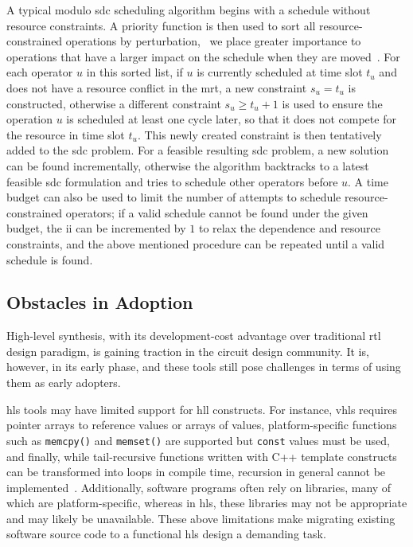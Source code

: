 A typical modulo \gls{sdc} scheduling algorithm begins with a schedule
without resource constraints.  A priority function is then used to sort
all resource-constrained operations by perturbation, \ie~we place greater
importance to operations that have a larger impact on the schedule when they
are moved~\cite{canis14}.  For each operator $u$ in this sorted list, if $u$ is
currently scheduled at time slot $t_u$ and does not have a resource conflict
in the \gls{mrt}, a new constraint $s_u = t_u$ is constructed, otherwise a
different constraint $s_u \geq t_u + 1$ is used to ensure the operation $u$
is scheduled at least one cycle later, so that it does not compete for the
resource in time slot $t_u$.  This newly created constraint is then tentatively
added to the \gls{sdc} problem.  For a feasible resulting \gls{sdc} problem, a
new solution can be found incrementally, otherwise the algorithm backtracks to
a latest feasible \gls{sdc} formulation and tries to schedule other operators
before $u$.  A time budget can also be used to limit the number of attempts to
schedule resource-constrained operators; if a valid schedule cannot be found
under the given budget, the \gls{ii} can be incremented by $1$ to relax the
dependence and resource constraints, and the above mentioned procedure can be
repeated until a valid schedule is found.


\subsection{Obstacles in Adoption}
\label{bg:sub:obstacles_in_adoption}

High-level synthesis, with its development-cost advantage over traditional
\gls{rtl} design paradigm, is gaining traction in the circuit design community.
It is, however, in its early phase, and these tools still pose challenges in
terms of using them as early adopters.

\Gls{hls} tools may have limited support for \gls{hll} constructs.  For
instance, \gls{vhls} requires pointer arrays to reference values or arrays of
values, platform-specific functions such as \verb|memcpy()| and \verb|memset()|
are supported but \verb|const| values must be used, and finally, while
tail-recursive functions written with C++ template constructs can be
transformed into loops in compile time, recursion in general cannot be
implemented~\cite{vivado_hls}.  Additionally, software programs often rely
on libraries, many of which are platform-specific, whereas in \gls{hls}\@,
these libraries may not be appropriate and may likely be unavailable.  These
above limitations make migrating existing software source code to a functional
\gls{hls} design a demanding task.

